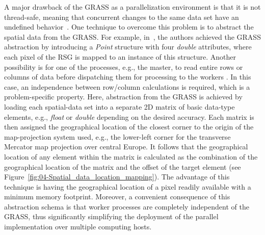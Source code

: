 A major drawback of the GRASS as a parallelization environment is
that it is not thread-safe, meaning that concurrent changes to the
same data set have an undefined behavior~\cite{Blazek_GRASS_server:2004}.
One technique to overcome this problem is to abstract the spatial
data from the GRASS. For example, in~\cite{Huang-Explorations_of_the_implementation_of_a_parallel_IDW_algorithm_in_a_Linux_cluster:2011},
the authors achieved the GRASS abstraction by introducing a \emph{Point
}structure with four \emph{double} attributes, where each pixel of
the RSG is mapped to an instance of this structure. Another possibility
is for one of the processes, e.g., the master, to read entire rows
or columns of data before dispatching them for processing to the workers
\cite{Akhter_Porting_GRASS_raster_module_to_distributed_computing:2007,Huang-Explorations_of_the_implementation_of_a_parallel_IDW_algorithm_in_a_Linux_cluster:2011}.
In this case, an independence between row/column calculations is required,
which is a problem-specific property. Here, abstraction from the GRASS
is achieved by loading each spatial-data set into a separate 2D matrix
of basic data-type elements, e.g., \emph{float} or \emph{double} depending
on the desired accuracy. Each matrix is then assigned the geographical
location of the closest corner to the origin of the map-projection
system used, e.g., the lower-left corner for the transverse Mercator
map projection over central Europe. It follows that the geographical
location of any element within the matrix is calculated as the combination
of the geographical location of the matrix and the offset of the target
element (see Figure~\ref{fig:04-Spatial_data_location_mapping}).
The advantage of this technique is having the geographical location
of a pixel readily available with a minimum memory footprint. Moreover,
a convenient consequence of this abstraction schema is that worker
processes are completely independent of the GRASS, thus significantly
simplifying the deployment of the parallel implementation over multiple
computing hosts.

